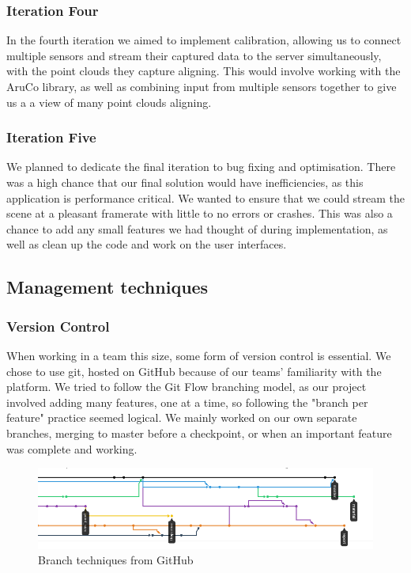 \documentclass{article}
\begin{document}
\subsubsection{Iteration Four}
In the fourth iteration we aimed to implement calibration, allowing us to connect multiple sensors and stream their captured data to the server simultaneously, with the point clouds they capture aligning. This would involve working with the AruCo library, as well as combining input from multiple sensors together to give us a a view of many point clouds aligning.
\subsubsection{Iteration Five}
We planned to dedicate the final iteration to bug fixing and optimisation. There was a high chance that our final solution would have inefficiencies, as this application is performance critical. We wanted to ensure that we could stream the scene at a pleasant framerate with little to no errors or crashes. This was also a chance to add any small features we had thought of during implementation, as well as clean up the code and work on the user interfaces.

\subsection{Management techniques}
\subsubsection{Version Control}
When working in a team this size, some form of version control is essential. We chose to use git, hosted on GitHub because of our teams' familiarity with the platform. We tried to follow the Git Flow branching model, as our project involved adding many features, one at a time, so following the "branch per feature" practice seemed logical. We mainly worked on our own separate branches, merging to master before a checkpoint, or when an important feature was complete and working. 
\begin{figure}[h]
  \centering
  \includegraphics[scale=0.5]{github}
  \caption{Branch techniques from GitHub}
  \label{fig:github}
\end{figure}
\\
\end{document}

